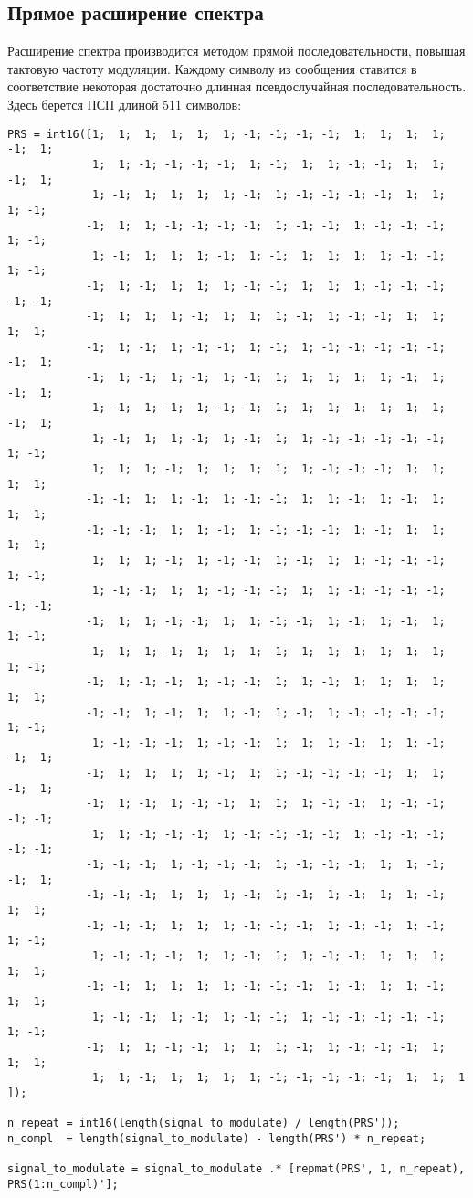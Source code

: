 \documentclass[a4paper]{article}
\begin{document}
\subsection{Прямое расширение спектра}
Расширение спектра производится методом прямой последовательности, повышая тактовую частоту модуляции. Каждому символу
из сообщения ставится в соответствие некоторая достаточно длинная псевдослучайная последовательность. Здесь берется ПСП
длиной 511 символов:\\
\begin{lstlisting}
PRS = int16([1;  1;  1;  1;  1;  1; -1; -1; -1; -1;  1;  1;  1;  1; -1;  1;
             1;  1; -1; -1; -1; -1;  1; -1;  1;  1; -1; -1;  1;  1; -1;  1;
             1; -1;  1;  1;  1;  1; -1;  1; -1; -1; -1; -1;  1;  1;  1; -1;
            -1;  1;  1; -1; -1; -1; -1;  1; -1; -1;  1; -1; -1; -1;  1; -1;
             1; -1;  1;  1;  1; -1;  1; -1;  1;  1;  1;  1; -1; -1;  1; -1;
            -1;  1; -1;  1;  1;  1; -1; -1;  1;  1;  1; -1; -1; -1; -1; -1;
            -1;  1;  1;  1; -1;  1;  1;  1; -1;  1; -1; -1;  1;  1;  1;  1;
            -1;  1; -1;  1; -1; -1;  1; -1;  1; -1; -1; -1; -1; -1; -1;  1;
            -1;  1; -1;  1; -1;  1; -1;  1;  1;  1;  1;  1; -1;  1; -1;  1;
             1; -1;  1; -1; -1; -1; -1; -1;  1;  1; -1;  1;  1;  1; -1;  1;
             1; -1;  1;  1; -1;  1; -1;  1;  1; -1; -1; -1; -1; -1;  1; -1;
             1;  1;  1; -1;  1;  1;  1;  1;  1; -1; -1; -1;  1;  1;  1;  1;
            -1; -1;  1;  1; -1;  1; -1; -1;  1;  1; -1;  1; -1;  1;  1;  1;
            -1; -1; -1;  1;  1; -1;  1; -1; -1; -1;  1; -1;  1;  1;  1;  1;
             1;  1;  1; -1;  1; -1; -1;  1; -1;  1;  1; -1; -1; -1;  1; -1;
             1; -1; -1;  1;  1; -1; -1; -1;  1;  1; -1; -1; -1; -1; -1; -1;
            -1;  1;  1; -1; -1;  1;  1; -1; -1;  1; -1;  1; -1;  1;  1; -1;
            -1;  1; -1; -1;  1;  1;  1;  1;  1;  1; -1;  1;  1; -1;  1; -1;
            -1;  1; -1; -1;  1; -1; -1;  1;  1; -1;  1;  1;  1;  1;  1;  1;
            -1; -1;  1; -1;  1;  1; -1;  1; -1;  1; -1; -1; -1; -1;  1; -1;
             1; -1; -1; -1;  1; -1; -1;  1;  1;  1; -1;  1;  1; -1; -1;  1;
            -1;  1;  1;  1;  1; -1;  1;  1; -1; -1; -1; -1;  1;  1; -1;  1;
            -1;  1; -1;  1; -1; -1;  1;  1;  1; -1; -1;  1; -1; -1; -1; -1;
             1;  1; -1; -1; -1;  1; -1; -1; -1; -1;  1; -1; -1; -1; -1; -1;
            -1; -1; -1;  1; -1; -1; -1;  1; -1; -1; -1;  1;  1; -1; -1;  1;
            -1; -1; -1;  1;  1;  1; -1;  1; -1;  1; -1;  1;  1; -1;  1;  1;
            -1; -1; -1;  1;  1;  1; -1; -1; -1;  1; -1; -1;  1; -1;  1; -1;
             1; -1; -1; -1;  1;  1; -1;  1;  1; -1; -1;  1;  1;  1;  1;  1;
            -1; -1;  1;  1;  1;  1; -1; -1; -1;  1; -1;  1;  1; -1;  1;  1;
             1; -1; -1;  1; -1;  1; -1; -1;  1; -1; -1; -1; -1; -1;  1; -1;
            -1;  1;  1; -1; -1;  1;  1;  1; -1;  1; -1; -1; -1;  1;  1;  1;
             1;  1; -1;  1;  1;  1;  1; -1; -1; -1; -1; -1;  1;  1;  1  ]);
             
n_repeat = int16(length(signal_to_modulate) / length(PRS'));
n_compl  = length(signal_to_modulate) - length(PRS') * n_repeat; 

signal_to_modulate = signal_to_modulate .* [repmat(PRS', 1, n_repeat), PRS(1:n_compl)'];
\end{lstlisting}
\end{document}
